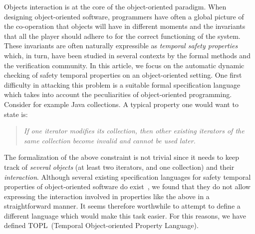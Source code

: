 \documentclass[10pt]{llncs} %
\newcommand{\TPL}{TOPL}
\begin{document}
Objects interaction is at the core of the object-oriented paradigm. When designing object-oriented software, 
programmers have often  a global picture of the co-operation that objects will have in different moments and the 
invariants that all the player should adhere to for the correct functioning of the system.
These invariants are often naturally expressible as {\em temporal safety properties} which, in turn, have been 
studied in several contexts by the formal methods and the verification community. 
%
In this article, we focus on the automatic dynamic checking of safety temporal properties on an object-oriented setting. 
One first difficulty in attacking this problem is a suitable formal specification language which takes into account the peculiarities of object-oriented programming. Consider for 
example  Java collections. A typical property one would want to state is:
\begin{quote}
{\em If one iterator modifies its collection, then other existing iterators of the same collection become invalid and cannot be used later.}
\end{quote}
\noindent
The formalization of the above constraint is not trivial since it 
needs to keep track of {\em several objects} (at least two iterators, and one collection) and their {\em interaction}.
Although several existing specification languages for safety temporal properties of object-oriented software do exist~\cite{strom1986,dblp:conf/oopsla/bierhoffa07,dblp:conf/oopsla/naeeml08,disney2011,ball2002},
we found that they do not allow expressing the interaction involved in properties like the above in a straightforward manner. 
It seems therefore worthwhile to attempt to define a different language which would make this task easier.  
For this reasons,  we have defined  \TPL\ (Temporal Object-oriented Property Language).
\end{document}
